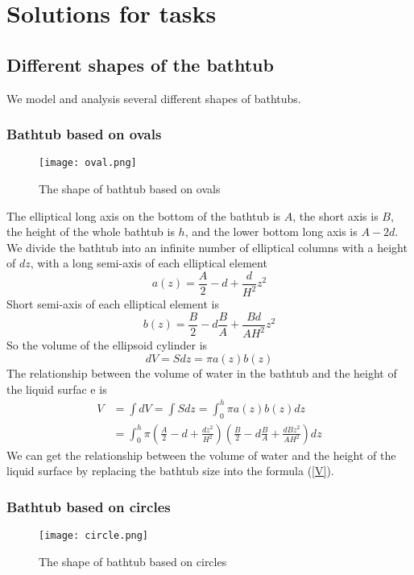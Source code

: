 \documentclass{mcmthesis}
\begin{document}
\section{Solutions for tasks }
\subsection{Different shapes of the bathtub}
We model and analysis several different shapes of bathtubs.
\subsubsection{Bathtub based on ovals}
\begin{figure}[H]
\centerline{\texttt{[image: oval.png]}}
\caption{The shape of bathtub based on ovals}
\label{oval}	
\end{figure}
The elliptical long axis on the bottom of the bathtub is $A$, the short axis is $B$, the height of the whole bathtub is $h$, and the lower bottom long axis is $A-2d$.\\
\indent We divide the bathtub into an infinite number of elliptical columns with a height of $dz$, with a long semi-axis of each elliptical element\\
\begin{equation}
a(z)=\frac{A}{2}-d+\frac{d}{{H}^{2}}{z}^{2}
\end{equation}
\indent Short semi-axis of each elliptical element is
\begin{equation}
b(z)=\frac{B}{2}-d\frac{B}{A}+\frac{Bd}{A{H}^{2}}{z}^{2}
\end{equation}
\indent So the volume of the ellipsoid cylinder is
\begin{equation}
dV=Sdz=\pi a(z)b(z)
\end{equation}
\indent The relationship between the volume of water in the bathtub and the height of the liquid surfac	e is
\begin{equation}
\begin{split}
V&=\int dV=\int Sdz=\int_{0}^{h}\pi a(z)b(z)dz \\
&=\int_{0}^{h}\pi(\frac{A}{2}-d+\frac{d{z}^{2}}{{H}^{2}})(\frac{B}{2}-d\frac{B}{A}+\frac{dB{z}^{2}}{A{H}^{2}})dz
\label{V}
\end{split}
\end{equation}
\indent We can get the relationship between the volume of water and the height of the liquid surface by replacing the bathtub size into the formula (\ref{V}).

\subsubsection{Bathtub based on circles}
\begin{figure}[H]
\centerline{\texttt{[image: circle.png]}}
\caption{The shape of bathtub based on circles}
\label{circle}	
\end{figure}
\end{document}
